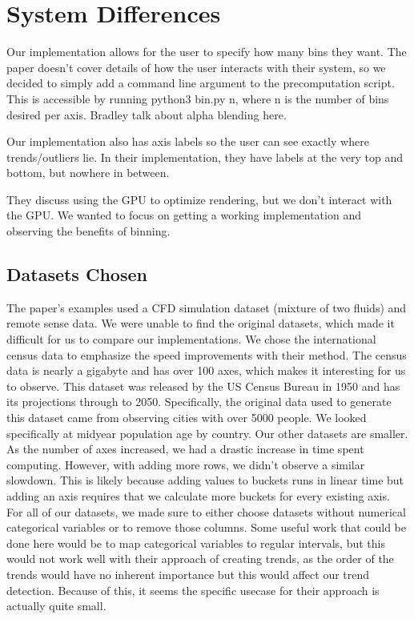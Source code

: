 \documentclass[	DIV=calc,%
			paper=a4,%
			fontsize=11pt,%
			twocolumn]{scrartcl}					%
\begin{document}
\section {System Differences}
Our implementation allows for the user to specify how many bins they want. The paper doesn't cover details of how the user interacts with their system, so we decided to simply add a command line argument to the precomputation script. This is accessible by running python3 bin.py n, where n is the number of bins desired per axis. 
Bradley talk about alpha blending here. 

Our implementation also has axis labels so the user can see exactly where trends/outliers lie. In their implementation,
they have labels at the very top and bottom, but nowhere in between. 

They discuss using the GPU to optimize rendering, but we don't interact with the GPU. We wanted to focus on 
getting a working implementation and observing the benefits of binning. 

\subsection {Datasets Chosen}
The paper's examples used a CFD simulation dataset (mixture of two fluids) and remote sense data. We were unable to find the original datasets, which made it difficult for us to compare our implementations. 
We chose the international census data to emphasize the speed improvements with their method. The census data is nearly a gigabyte and has over 100 axes, which makes it interesting for us to observe. This dataset was released by the US Census Bureau in 1950 and has its projections through to 2050. Specifically, the original data used to generate this dataset came from observing cities with over 5000 people. We looked specifically at midyear population age by country. 
Our other datasets are smaller. As the number of axes increased, we had a drastic increase in time spent computing. However, with adding more rows, we didn't observe a similar slowdown. This is likely because adding values to buckets runs in linear time but adding an axis requires that we calculate more buckets for every existing axis. \\

For all of our datasets, we made sure to either choose datasets without numerical categorical variables or to remove those columns. Some useful work that could be done here would be to
map categorical variables to regular intervals, but this would not work well with their approach of creating trends, as the order of the trends would have no inherent importance
but this would affect our trend detection. Because of this, it seems the specific usecase for their approach is actually quite small. 
\end{document}
